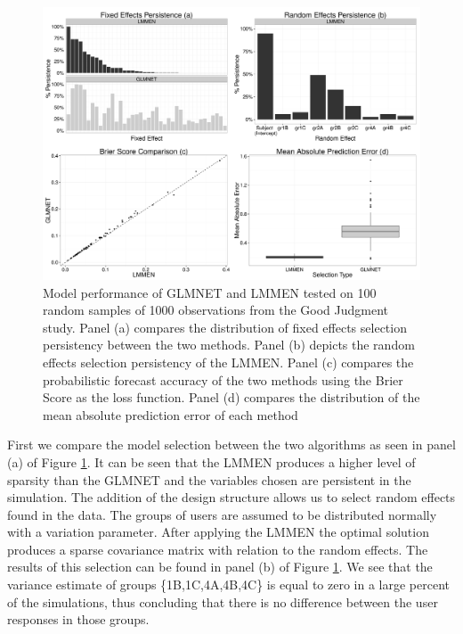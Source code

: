 \documentclass{article}
\begin{document}
\begin{figure}[h]
\centering
\includegraphics{figs/lmmen_paper-casepanel}
\caption{Model performance of GLMNET and LMMEN tested on 100 random samples of 1000 observations from the Good Judgment study. Panel (a) compares the distribution of fixed effects selection persistency between the two methods. Panel (b) depicts the random effects selection persistency of the LMMEN. Panel (c) compares the probabilistic forecast accuracy of the two methods using the Brier Score as the loss function. Panel (d) compares the distribution of the mean absolute prediction error of each method}
\label{fig:perform}
\end{figure}
%
First we compare the model selection between the two algorithms as seen in panel (a) of Figure \ref{fig:perform}. It can be seen that the LMMEN produces a higher level of sparsity than the GLMNET and the variables chosen are persistent in the simulation.
The addition of the design structure allows us to select random effects found in the data. The groups of users are assumed to be distributed normally with a variation parameter. After applying the LMMEN the optimal solution produces a sparse covariance matrix with relation to the random effects. The results of this selection can be found in panel (b) of Figure \ref{fig:perform}. We see that the variance estimate of groups \{1B,1C,4A,4B,4C\} is equal to zero in a large percent of the simulations, thus concluding that there is no difference between the user responses in those groups.
\end{document}
